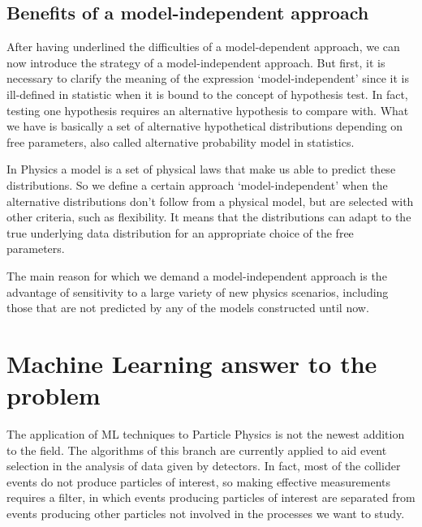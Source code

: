 \subsection{Benefits of a model-independent approach}
After having underlined the difficulties of a model-dependent approach, we can now introduce the strategy of a model-independent approach. But first, it is necessary to clarify the meaning of the expression `model-independent' since it is ill-defined in statistic when it is bound to the concept of hypothesis test. In fact, testing one hypothesis requires an alternative hypothesis to compare with. What we have is basically a set of alternative hypothetical distributions depending on free parameters, also called alternative probability model in statistics. 

In Physics a model is a set of physical laws that make us able to predict these distributions. So we define a certain approach `model-independent' when the alternative distributions don't follow from a physical model, but are selected with other criteria, such as flexibility. It means that the distributions can adapt to the true underlying data distribution for an appropriate choice of the free parameters.

The main reason for which we demand a model-independent approach is the advantage of sensitivity to a large variety of new physics scenarios, including those that are not predicted by any of the models constructed until now.





\section{Machine Learning answer to the problem}
The application of ML techniques to Particle Physics is not the newest addition to the field. The algorithms of this branch are currently applied to aid event selection in the analysis of data given by detectors. In fact, most of the collider events do not produce particles of interest, so making effective measurements requires a filter, in which events producing particles of interest are separated from events producing other particles not involved in the processes we want to study.

